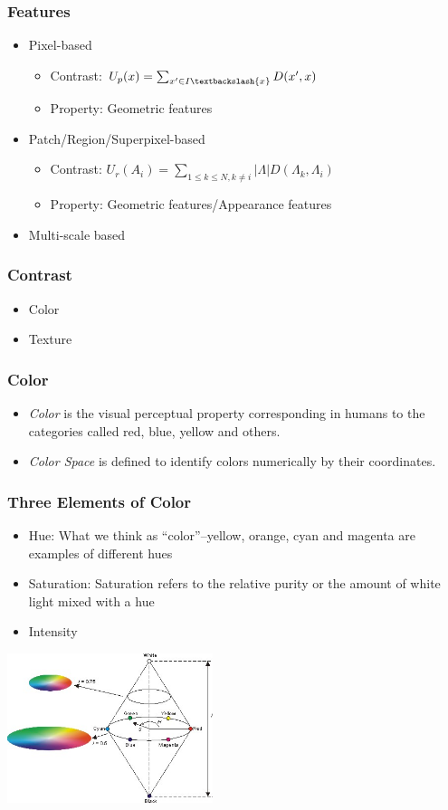\documentclass[notheorems,serif,table,compress]{beamer}  %
\begin{document}
\begin{frame}
\frametitle{Features}
\begin{itemize}
\item Pixel-based
\begin{itemize}
\item Contrast: $U_p(x) = \sum_{x'\in I\textbackslash \{ x\}}D(x', x)$
\item Property: Geometric features
\end{itemize}
\item Patch/Region/Superpixel-based
\begin{itemize}
\item {\color{magenta}Contrast}: $U_r(A_i) = \sum_{1\le k \le N, k \ne i}|\Lambda|D(\Lambda_k, \Lambda_i)$
\item {\color{magenta}Property}: Geometric features/Appearance features
\end{itemize}
\item Multi-scale based
\end{itemize}
\end{frame}


\begin{frame}
\frametitle{ Contrast}
\begin{itemize}
\item Color
\item Texture
\end{itemize}
\end{frame}


\begin{frame}
\frametitle{Color}
\begin{itemize}
\item {\color{blue}\emph{Color}} is the visual perceptual property corresponding in humans to the categories called red, blue, yellow and others.
\item {\color{blue}\emph{Color Space}} is defined to identify colors numerically by their coordinates.
\end{itemize}
\end{frame}


\begin{frame}
\frametitle{Three Elements of Color}
\begin{itemize}
\item Hue: What we think as ``color''--yellow, orange, cyan and magenta are examples of different hues
\item Saturation: Saturation refers to the relative purity or the amount of white light mixed with a hue
\item Intensity
\end{itemize}
\centering\includegraphics[width=6cm]{HSIColorModel.jpg}
\end{frame}
\end{document}
